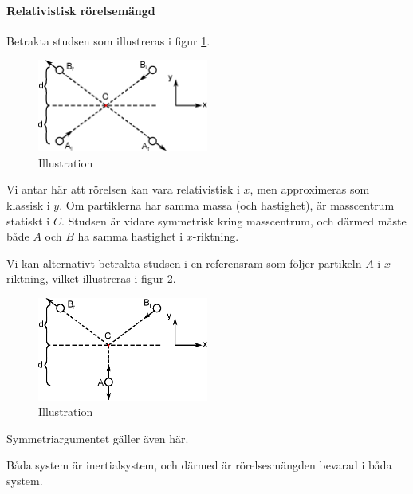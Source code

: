 \paragraph{Relativistisk rörelsemängd}
Betrakta studsen som illustreras i figur \ref{fig:collision_inertial}.
\begin{figure}[!ht]
	\centering
	\includegraphics[width = 0.5\textwidth]{./Images/collision_inertial.eps}
	\caption{Illustration}
	\label{fig:collision_inertial}
\end{figure}

Vi antar här att rörelsen kan vara relativistisk i $x$, men approximeras som klassisk i $y$. Om partiklerna har samma massa (och hastighet), är masscentrum statiskt i $C$. Studsen är vidare symmetrisk kring masscentrum, och därmed måste både $A$ och $B$ ha samma hastighet i $x$-riktning.

Vi kan alternativt betrakta studsen i en referensram som följer partikeln $A$ i $x$-riktning, vilket illustreras i figur \ref{fig:collision_following}.
\begin{figure}[!ht]
	\centering
	\includegraphics[width = 0.5\textwidth]{./Images/collision_following.eps}
	\caption{Illustration}
	\label{fig:collision_following}
\end{figure}
Symmetriargumentet gäller även här.

Båda system är inertialsystem, och därmed är rörelsesmängden bevarad i båda system.

